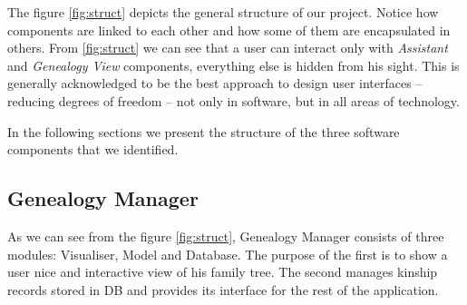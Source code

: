     The figure \ref{fig:struct} depicts the general structure of our project. Notice how components are linked to each other and
    how some of them are encapsulated in others. From \ref{fig:struct} we can see that a user can interact only with
    \textit{Assistant} and \textit{Genealogy View} components, everything else is hidden from his sight. This is generally
    acknowledged to be the best approach to design user interfaces -- reducing degrees of freedom -- not only in software, but in
    all areas of technology.

    In the following sections we present the structure of the three software components that we identified.

\subsection{Genealogy Manager}
    As we can see from the figure \ref{fig:struct}, Genealogy Manager consists of three modules: Visualiser, Model and Database.
    The purpose of the first is to show a user nice and interactive view of his family tree. The second manages kinship
    records stored in DB and provides its interface for the rest of the application.


